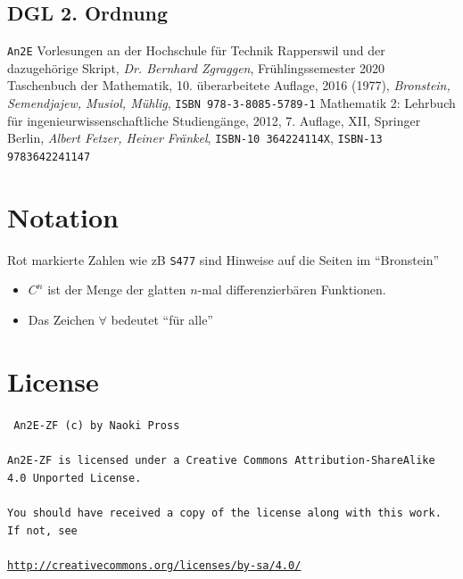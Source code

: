 \documentclass[margin=small, twocolumn]{hsrzf}
\numberwithin{equation}{subsection}
\newcommand{\brpage}[1]{\textcolor{red!70!black}{\small\texttt{S#1}}}
\begin{document}
\subsection{DGL 2. Ordnung}


\begin{thebibliography}{3}
    \texttt{An2E} Vorlesungen an der Hochschule f\"ur Technik Rapperswil und der dazugeh\"orige Skript,
    \textit{Dr. Bernhard Zgraggen}, Fr\"uhlingssemester 2020
    Taschenbuch der Mathematik,
    10. \"uberarbeitete Auflage, 2016 (1977),
    \textit{Bronstein, Semendjajew, Musiol, M\"uhlig}, 
    \texttt{ISBN 978-3-8085-5789-1}
    Mathematik 2: Lehrbuch für ingenieurwissenschaftliche Studieng\"ange,
    2012, 7. Auflage, XII, Springer Berlin,
    \textit{Albert Fetzer, Heiner Fränkel},
    \texttt{ISBN-10 364224114X},
    \texttt{ISBN-13 9783642241147}
    
\end{thebibliography}

\section*{Notation}
Rot markierte Zahlen wie zB \brpage{477} sind Hinweise auf die Seiten im ``Bronstein'' \cite{bronstein}

\begin{itemize}
    \item \(C^n\) ist der Menge der glatten \(n\)-mal differenzierb\"aren Funktionen.
    \item Das Zeichen \(\forall\) bedeutet ``f\"ur alle''
\end{itemize}

\section*{License}
{ \tt
An2E-ZF (c) by Naoki Pross
\\\\
An2E-ZF is licensed under a Creative Commons Attribution-ShareAlike 4.0 Unported License.
\\\\
You should have received a copy of the license along with this work. If not, see 
\\\\
{\small\url{http://creativecommons.org/licenses/by-sa/4.0/}}
}


\onecolumn
\end{document}
